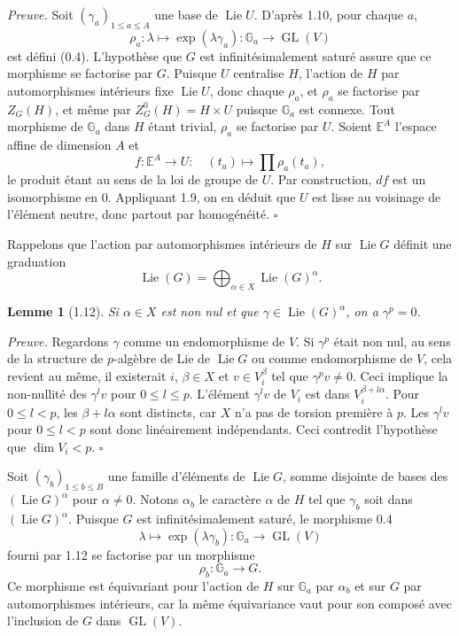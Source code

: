 \documentclass[10pt]{article}
\newcommand{\Ga}{\mathbb G_a}
\newcommand{\GL}{\operatorname{GL}}
\newcommand{\Lie}{\operatorname{Lie}}
\theoremstyle{deligne}
\newtheorem*{lemma*}{Lemme}
\newenvironment{proofdel}{\textit{Preuve.}}{\hfill$\square$}
\newcommand{\heading}[1]{\vspace{0.7em}\noindent{\bfseries #1}\quad}
\begin{document}
\begin{proofdel}
Soit \((\gamma_a)_{1\le a\le A}\) une base de \(\Lie U\). D'après 1.10, pour chaque \(a\),
\[
  \rho_a:\lambda\longmapsto \exp(\lambda\gamma_a):\Ga\longrightarrow\GL(V)
\]
est défini (0.4). L'hypothèse que \(G\) est infinitésimalement saturé assure que ce morphisme se factorise par \(G\). Puisque \(U\) centralise \(H\), l'action de \(H\) par automorphismes intérieurs fixe \(\Lie U\), donc chaque \(\rho_a\), et \(\rho_a\) se factorise par \(Z_G(H)\), et même par \(Z^0_G(H)=H\times U\) puisque \(\Ga\) est connexe. Tout morphisme de \(\Ga\) dans \(H\) étant trivial, \(\rho_a\) se factorise par \(U\). Soient \(\mathbb E^A\) l'espace affine de dimension \(A\) et
\[
  f:\mathbb E^A\longrightarrow U:\quad (t_a)\longmapsto \prod \rho_a(t_a),
\]
le produit étant au sens de la loi de groupe de \(U\). Par construction, \(df\) est un isomorphisme en \(0\). Appliquant 1.9, on en déduit que \(U\) est lisse au voisinage de l'élément neutre, donc partout par homogénéité.
\end{proofdel}

Rappelons que l'action par automorphismes intérieurs de \(H\) sur \(\Lie G\) définit une graduation
\[
  \Lie(G)=\bigoplus_{\alpha\in X}\Lie(G)^\alpha .
\]

\begin{lemma*}[1.12]
Si \(\alpha\in X\) est non nul et que \(\gamma\in\Lie(G)^\alpha\), on a \(\gamma^p=0\).
\end{lemma*}

\begin{proofdel}
Regardons \(\gamma\) comme un endomorphisme de \(V\). Si \(\gamma^p\) était non nul, au sens de la structure de \(p\)-algèbre de Lie de \(\Lie G\) ou comme endomorphisme de \(V\), cela revient au même, il existerait \(i\), \(\beta\in X\) et \(v\in V_i^\beta\) tel que \(\gamma^p v\ne0\). Ceci implique la non-nullité des \(\gamma^l v\) pour \(0\le l\le p\). L'élément \(\gamma^l v\) de \(V_i\) est dans \(V_i^{\beta+l\alpha}\). Pour \(0\le l<p\), les \(\beta+l\alpha\) sont distincts, car \(X\) n'a pas de torsion première à \(p\). Les \(\gamma^l v\) pour \(0\le l<p\) sont donc linéairement indépendants. Ceci contredit l'hypothèse que \(\dim V_i<p\).
\end{proofdel}

\heading{1.13.} Soit \((\gamma_b)_{1\le b\le B}\) une famille d'éléments de \(\Lie G\), somme disjointe de bases des \((\Lie G)^\alpha\) pour \(\alpha\ne0\). Notons \(\alpha_b\) le caractère \(\alpha\) de \(H\) tel que \(\gamma_b\) soit dans \((\Lie G)^\alpha\). Puisque \(G\) est infinitésimalement saturé, le morphisme 0.4
\[
  \lambda\longmapsto \exp(\lambda\gamma_b):\Ga\longrightarrow\GL(V)
\]
fourni par 1.12 se factorise par un morphisme
\[
  \rho_b:\Ga\longrightarrow G.
\]
Ce morphisme est équivariant pour l'action de \(H\) sur \(\Ga\) par \(\alpha_b\) et sur \(G\) par automorphismes intérieurs, car la même équivariance vaut pour son composé avec l'inclusion de \(G\) dans \(\GL(V)\).
\end{document}

